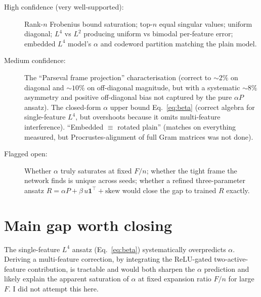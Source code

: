 \documentclass[11pt]{article}
\begin{document}
\begin{description}
\item[High confidence (very well-supported):] Rank-$n$ Frobenius bound
saturation; top-$n$ equal singular values; uniform diagonal; $L^4$ vs $L^2$
producing uniform vs bimodal per-feature error; embedded $L^4$ model's
$\alpha$ and codeword partition matching the plain model.
\item[Medium confidence:] The ``Parseval frame projection'' characterisation
(correct to $\sim 2\%$ on diagonal and $\sim 10\%$ on off-diagonal magnitude,
but with a systematic $\sim 8\%$ asymmetry and positive off-diagonal bias not
captured by the pure $\alpha P$ ansatz). The closed-form $\alpha$ upper bound
Eq.~\eqref{eq:beta} (correct algebra for single-feature $L^4$, but overshoots
because it omits multi-feature interference). ``Embedded $\equiv$ rotated plain''
(matches on everything measured, but Procrustes-alignment of full Gram
matrices was not done).
\item[Flagged open:] Whether $\alpha$ truly saturates at fixed $F/n$;
whether the tight frame the network finds is unique across seeds; whether
a refined three-parameter ansatz $R = \alpha P + \beta\,u\mathbf{1}^\top +
\text{skew}$ would close the gap to trained $R$ exactly.
\end{description}

\section{Main gap worth closing}

The single-feature $L^4$ ansatz (Eq.~\ref{eq:beta}) systematically
overpredicts $\alpha$. Deriving a multi-feature correction, by integrating
the ReLU-gated two-active-feature contribution, is tractable and would both
sharpen the $\alpha$ prediction and likely explain the apparent saturation
of $\alpha$ at fixed expansion ratio $F/n$ for large $F$. I did not attempt
this here.
\end{document}
